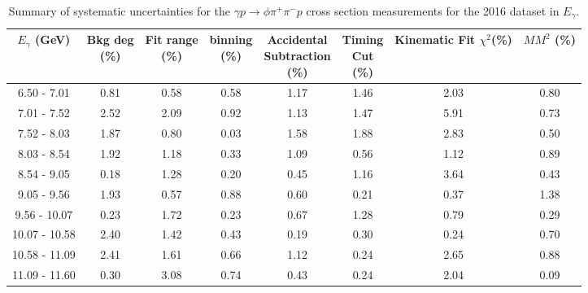\newpage
\begin{center}
\null
\vfill
\begin{table}[!htbp]
    \small
    \centering
    \caption{Summary of systematic uncertainties for the $\gamma p \rightarrow \phi \pi^{+} \pi^{-} p$ cross section measurements for the 2016 dataset in $E_{\gamma}$.}
    \label{tab.y2175.syserr.phi2pi.1.1}
    \begin{tabular}{|c|c|c|c|c|c|c|c|}
        \hline
        $E_{\gamma}$ (GeV) & \thead{Bkg deg\\(\%)} & \thead{Fit range\\(\%)} & \thead{binning\\(\%)} & \thead{Accidental\\Subtraction\\(\%)} & \thead{Timing\\Cut\\(\%)} & \thead{Kinematic\\Fit $\chi^{2}$(\%)} & \thead{$MM^{2}$\\(\%)} \\
        \hline
        6.50 - 7.01 & 0.81 & 0.58 & 0.58 & 1.17 & 1.46 & 2.03 & 0.80 \\ 
        7.01 - 7.52 & 2.52 & 2.09 & 0.92 & 1.13 & 1.47 & 5.91 & 0.73 \\ 
        7.52 - 8.03 & 1.87 & 0.80 & 0.03 & 1.58 & 1.88 & 2.83 & 0.50 \\ 
        8.03 - 8.54 & 1.92 & 1.18 & 0.33 & 1.09 & 0.56 & 1.12 & 0.89 \\ 
        8.54 - 9.05 & 0.18 & 1.28 & 0.20 & 0.45 & 1.16 & 3.64 & 0.43 \\ 
        9.05 - 9.56 & 1.93 & 0.57 & 0.88 & 0.60 & 0.21 & 0.37 & 1.38 \\ 
        9.56 - 10.07 & 0.23 & 1.72 & 0.23 & 0.67 & 1.28 & 0.79 & 0.29 \\ 
        10.07 - 10.58 & 2.40 & 1.42 & 0.43 & 0.19 & 0.30 & 0.24 & 0.70 \\ 
        10.58 - 11.09 & 2.41 & 1.61 & 0.66 & 1.12 & 0.24 & 2.65 & 0.88 \\ 
        11.09 - 11.60 & 0.30 & 3.08 & 0.74 & 0.43 & 0.24 & 2.04 & 0.09 \\
        \hline
    \end{tabular}
\end{table}
\end{center}

